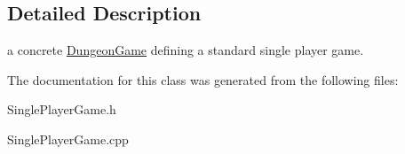 \subsection{Detailed Description}
a concrete \hyperlink{class_dungeon_game}{Dungeon\+Game} defining a standard single player game. 

The documentation for this class was generated from the following files\+:\begin{DoxyCompactItemize}
\item 
Single\+Player\+Game.\+h\item 
Single\+Player\+Game.\+cpp\end{DoxyCompactItemize}
